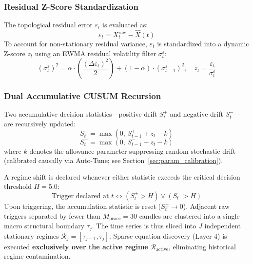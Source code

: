 \documentclass[11pt,a4paper]{article}
\begin{document}
\subsubsection{Residual Z-Score Standardization}
The topological residual error $\varepsilon_t$ is evaluated as:
\begin{equation}
    \varepsilon_t = X_t^{\text{raw}} - \hat{X}(t)
\end{equation}
To account for non-stationary residual variance, $\varepsilon_t$ is standardized into a dynamic Z-score $z_t$ using an EWMA residual volatility filter $\sigma_t^{\varepsilon}$:
\begin{equation}
    (\sigma_t^{\varepsilon})^2 = \alpha \cdot \left( \frac{(\Delta \varepsilon_t)^2}{2} \right) + (1 - \alpha) \cdot (\sigma_{t-1}^{\varepsilon})^2, \quad z_t = \frac{\varepsilon_t}{\sigma_t^{\varepsilon}}
\end{equation}

\subsubsection{Dual Accumulative CUSUM Recursion}
Two accumulative decision statistics---positive drift $S_t^+$ and negative drift $S_t^-$---are recursively updated:
\begin{equation}
    S_t^+ = \max \left( 0, \, S_{t-1}^+ + z_t - k \right)
\end{equation}
\begin{equation}
    S_t^- = \max \left( 0, \, S_{t-1}^- - z_t - k \right)
\end{equation}
where $k$ denotes the allowance parameter suppressing random stochastic drift (calibrated causally via Auto-Tune; see Section~\ref{sec:param_calibration}).

A regime shift is declared whenever either statistic exceeds the critical decision threshold $H = 5.0$:
\begin{equation}
    \text{Trigger declared at } t \iff \left( S_t^+ > H \right) \lor \left( S_t^- > H \right)
\end{equation}
Upon triggering, the accumulation statistic is reset ($S_t^\pm \to 0$). Adjacent raw triggers separated by fewer than $M_{\text{peace}} = 30$ candles are clustered into a single macro structural boundary $\tau_j$. The time series is thus sliced into $J$ independent stationary regimes $\mathcal{R}_j = [\tau_{j-1}, \tau_j]$. Sparse equation discovery (Layer 4) is executed \textbf{exclusively over the active regime} $\mathcal{R}_{\text{active}}$, eliminating historical regime contamination.
\end{document}
